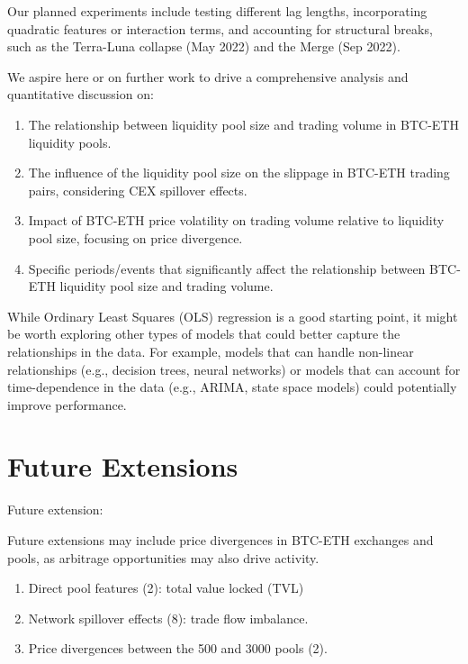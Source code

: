 \documentclass{article}
\begin{document}
Our planned experiments include testing different lag lengths, incorporating quadratic features or interaction terms, and accounting for structural breaks, such as the Terra-Luna collapse (May 2022) and the Merge (Sep 2022).

We aspire here or on further work to drive a comprehensive analysis and quantitative discussion on:

\begin{enumerate}[itemsep=0pt, topsep=0pt]
\item The relationship between liquidity pool size and trading volume in BTC-ETH liquidity pools.
\item The influence of the liquidity pool size on the slippage in BTC-ETH trading pairs, considering CEX spillover effects.
\item Impact of BTC-ETH price volatility on trading volume relative to liquidity pool size, focusing on price divergence.
\item Specific periods/events that significantly affect the relationship between BTC-ETH liquidity pool size and trading volume.
\end{enumerate}


While Ordinary Least Squares (OLS) regression is a good starting point, it might be worth exploring other types of models that could better capture the relationships in the data. For example, models that can handle non-linear relationships (e.g., decision trees, neural networks) or models that can account for time-dependence in the data (e.g., ARIMA, state space models) could potentially improve performance.


\section*{\textbf{Future Extensions}}
Future extension:

Future extensions may include price divergences in BTC-ETH exchanges and pools, as arbitrage opportunities may also drive activity.

\begin{enumerate}[label=\arabic*. ,itemsep=0pt, topsep=0pt]
\item Direct pool features (2): total value locked (TVL)
\item Network spillover effects (8): trade flow imbalance.
\item Price divergences between the 500 and 3000 pools (2).
\end{enumerate}
\end{document}
